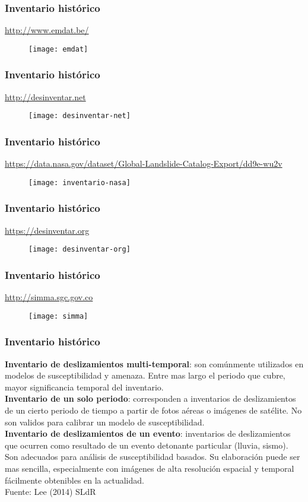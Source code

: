 \documentclass[12pt]{beamer}
\begin{document}
\begin{frame}
\frametitle{Inventario histórico}
\url{http://www.emdat.be/}
\begin{figure}
   	\texttt{[image: emdat]}
\end{figure}
\end{frame}
\begin{frame}
\frametitle{Inventario histórico}
\url{http://desinventar.net}
\begin{figure}
   	\texttt{[image: desinventar-net]}
\end{figure}
\end{frame}
\begin{frame}
\frametitle{Inventario histórico}
\scriptsize{\url{https://data.nasa.gov/dataset/Global-Landslide-Catalog-Export/dd9e-wu2v}}
\begin{figure}
   	\texttt{[image: inventario-nasa]}
\end{figure}
\end{frame}
\begin{frame}
\frametitle{Inventario histórico}
\url{https://desinventar.org}
\begin{figure}
   	\texttt{[image: desinventar-org]}
\end{figure}
\end{frame}
\begin{frame}
\frametitle{Inventario histórico}
\url{http://simma.sgc.gov.co}
\begin{figure}
   	\texttt{[image: simma]}
\end{figure}
\end{frame}
\begin{frame}
\frametitle{Inventario histórico}
\justifying
\scriptsize{
\textbf{Inventario de deslizamientos multi-temporal}: son comúnmente utilizados en modelos de susceptibilidad y amenaza. Entre mas largo el periodo que cubre, mayor significancia temporal del inventario.\\
\vspace{0.5cm}
\textbf{Inventario de un solo periodo}: corresponden a inventarios de deslizamientos de un cierto periodo de tiempo a partir de fotos aéreas o imágenes de satélite. No son validos para calibrar un modelo de susceptibilidad.\\
\vspace{0.5cm}
\textbf{Inventario de deslizamientos de un evento}: inventarios de deslizamientos que ocurren como resultado de un evento detonante particular (lluvia, sismo). Son adecuados para análisis de susceptibilidad basados. Su elaboración puede ser mas sencilla, especialmente con imágenes de alta resolución espacial y temporal fácilmente obtenibles en la actualidad.}\\
\vspace{2cm}
\tiny{Fuente: Lee (2014) SLdR}
\end{frame}
\end{document}

